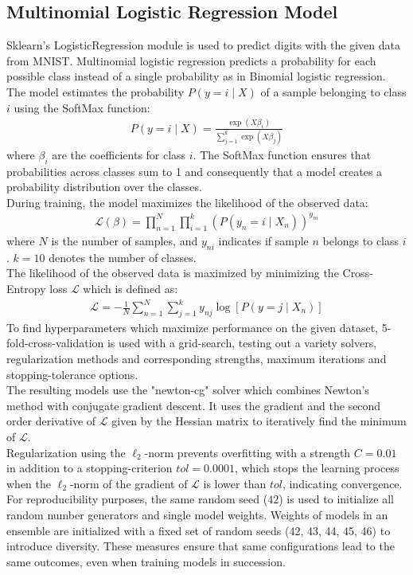 \documentclass{article}
\theoremstyle{plain}
\theoremstyle{definition}
\theoremstyle{remark}
\begin{document}
\subsection{Multinomial Logistic Regression Model}
Sklearn's LogisticRegression module is used to predict digits with the given data from MNIST. Multinomial logistic regression predicts a probability for each possible class instead of a single probability as in Binomial logistic regression.
\\
The model estimates the probability $P(y=i \mid X)$ of a sample belonging to class $i$ using the SoftMax function:
\begin{align}
	P(y=i \mid X)=\frac{\exp \left(X \beta_i\right)}{\sum_{j=1}^k \exp \left(X \beta_j\right)}
\end{align}
where $\beta_i$ are the coefficients for class $i$. The SoftMax function ensures that probabilities across classes sum to 1 and consequently that a model creates a probability distribution over the classes. \\
During training, the model maximizes the likelihood of the observed data:
\begin{align}
	\mathcal{L}(\beta)=\prod_{n=1}^N \prod_{i=1}^k\left(P\left(y_n=i \mid X_n\right)\right)^{y_{n i}}
\end{align}
where $N$ is the number of samples, and $y_{n i}$ indicates if sample $n$ belongs to class $i$. $k=10$ denotes the number of classes. \\
The likelihood of the observed data is maximized by minimizing the Cross-Entropy loss $\mathcal{L}$ which is defined as:
\begin{align}
	\mathcal{L}=-\frac{1}{N} \sum_{n=1}^N \sum_{j=1}^k y_{n j} \log \left[P\left(y=j \mid X_n\right)\right]
\end{align}
To find hyperparameters which maximize performance on the given dataset, 5-fold-cross-validation is used with a grid-search, testing out a variety solvers, regularization methods and corresponding strengths, maximum iterations and stopping-tolerance options. \\
The resulting models use the "newton-cg" solver which combines Newton's method with conjugate gradient descent. It uses the gradient and the second order derivative of $\mathcal{L}$ given by the Hessian matrix to iteratively find the minimum of $\mathcal{L}$. \\
Regularization using the $\ell_2$-norm prevents overfitting with a strength $C=0.01$ in addition to a stopping-criterion $tol=0.0001$, which stops the learning process when the $\ell_2$-norm of the gradient of $\mathcal{L}$ is lower than $tol$, indicating convergence. \\
For reproducibility purposes, the same random seed ($42$) is used to initialize all random number generators and single model weights. Weights of models in an ensemble are initialized with a fixed set of random seeds (42, 43, 44, 45, 46) to introduce diversity. These measures ensure that same configurations lead to the same outcomes, even when training models in succession. 
\end{document}
